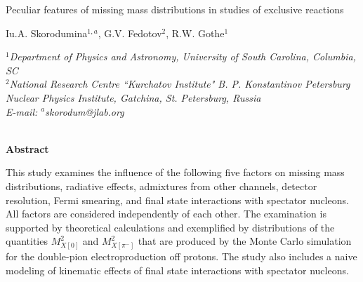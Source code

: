\noindent\begin{minipage}{\textwidth}
\begin{center}
\thispagestyle{empty}
\vspace{0.5cm}
{ \Large{Peculiar features of missing mass distributions in studies of exclusive reactions}}\\
\vspace{1cm}

{\large Iu.A. Skorodumina$^{1, a}$, G.V. Fedotov$^{2}$,  R.W. Gothe$^{1}$} \\[16pt]

\parbox{.86\textwidth}{\centering\footnotesize\it
$^1$Department of Physics and Astronomy, University of South Carolina, Columbia, SC\\[8pt]
$^2$National Research Centre ``Kurchatov Institute" B. P. Konstantinov Petersburg Nuclear Physics Institute, Gatchina, St. Petersburg, Russia\\
[20pt]
E-mail: $^a$skorodum@jlab.org}\\


\vspace{2cm}
{\bf Abstract}\\[9pt]

\end{center}
{\small This study examines the influence of the following five factors on missing mass distributions, radiative effects, admixtures from other channels, detector resolution, Fermi smearing, and final state interactions with spectator nucleons. All factors are considered independently of each other. The examination is supported by theoretical calculations and exemplified by distributions of the quantities $M^{2}_{X[0]}$ and $M^{2}_{X[\pi^{-}]}$ that are produced by the Monte Carlo simulation for the double-pion electroproduction off protons. The study also includes a naive modeling of kinematic effects of final state interactions with spectator nucleons.}


\end{minipage}

